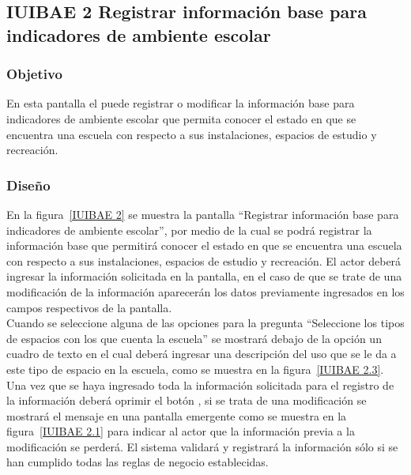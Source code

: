 \subsection{IUIBAE 2 Registrar información base para indicadores de ambiente escolar}

\subsubsection{Objetivo}

      En esta pantalla el  puede registrar o modificar la información base para indicadores de ambiente escolar que permita conocer el estado en que se encuentra una escuela con respecto a sus instalaciones, espacios de estudio y recreación.

\subsubsection{Diseño}

    En la figura~\ref{IUIBAE 2} se muestra la pantalla ``Registrar información base para indicadores de ambiente escolar'', por medio de la cual se podrá registrar la información base que permitirá conocer el estado en que se encuentra una escuela con respecto a sus instalaciones, espacios de estudio y recreación. El actor deberá ingresar la información solicitada en la pantalla, en el caso de que se trate de una modificación de la información aparecerán los datos previamente ingresados en los campos respectivos de la pantalla.\\
    
    Cuando se seleccione alguna de las opciones para la pregunta ``Seleccione los tipos de espacios con los que cuenta la escuela'' se mostrará debajo de la opción un cuadro de texto en el cual deberá ingresar una descripción del uso que se le da a este tipo de espacio en la escuela, como se muestra en la figura~\ref{IUIBAE 2.3}.\\ 
    
    Una vez que se haya ingresado toda la información solicitada para el registro de la información deberá oprimir el botón , si se trata de una modificación se mostrará el mensaje  en una pantalla emergente como se muestra en la figura~\ref{IUIBAE 2.1} para indicar al actor que la información previa a la modificación se perderá. El sistema validará y registrará la información sólo si se han cumplido todas las reglas de negocio establecidas.\\
    
